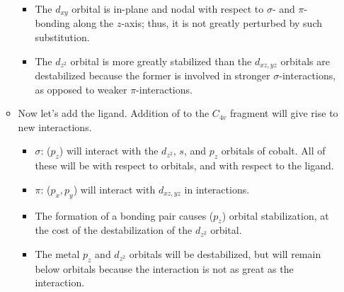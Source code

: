 \documentclass[../notes.tex]{subfiles}
\begin{document}
\begin{itemize}
\begin{itemize}
\begin{itemize}
            \item The $d_{xy}$ orbital is in-plane and nodal with respect to $\sigma$- and $\pi$-bonding along the $z$-axis; thus, it is not greatly perturbed by such substitution.
            \item The $d_{z^2}$ orbital is more greatly stabilized than the $d_{xz,yz}$ orbitals are destabilized because the former is involved in stronger $\sigma$-interactions, as opposed to weaker $\pi$-interactions.
        \end{itemize}
        \item Now let's add the  ligand. Addition of  to the $C_{4v}$ fragment will give rise to new interactions.
        \begin{itemize}
            \item $\sigma$: ($p_z$) will interact with the $d_{z^2}$, $s$, and $p_z$ orbitals of cobalt. All of these will be  with respect to  orbitals, and  with respect to the ligand.
            \item $\pi$: ($p_x,p_y$) will interact with $d_{xz,yz}$ in  interactions.
            \item The formation of a bonding pair causes ($p_z$) orbital stabilization, at the cost of the destabilization of the $d_{z^2}$ orbital.
            \item The metal $p_z$ and $d_{z^2}$ orbitals will be destabilized, but will remain below  orbitals because the  interaction is not as great as the  interaction.
        \end{itemize}
    \end{itemize}
\end{itemize}
\end{document}
